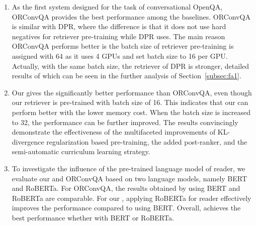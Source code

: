 \begin{enumerate}
    \item As the first system designed for the task of conversational OpenQA, ORConvQA provides the best performance among the baselines. ORConvQA is similar with DPR, where the difference is that it does not use hard negatives for retriever pre-training while DPR uses. The main reason ORConvQA performs better is the batch size of retriever pre-training is assigned with 64 as it uses 4 GPUs and set batch size to 16 per GPU. Actually, with the same batch size, the retriever of DPR is stronger, detailed results of which can be seen in the further analysis of Section~\ref{subsec:fa1}. 
    \item Our {\modelname} gives the significantly better performance than ORConvQA, even though our retriever is pre-trained with batch size of 16. This indicates that our {\modelname} can perform better with the lower memory cost. When the batch size is increased to 32, the performance can be further improved. The results convincingly demonstrate the effectiveness of the multifaceted improvements of KL-divergence regularization based pre-training, the added post-ranker, and the semi-automatic curriculum learning strategy.
    \item To investigate the influence of the pre-trained language model of reader, we evaluate our {\modelname} and ORConvQA based on two language models, namely BERT and RoBERTa. For ORConvQA, the results obtained by using BERT and RoBERTa are comparable. For our {\modelname}, applying RoBERTa for reader effectively improves the performance compared to using BERT. Overall, {\modelname} achieves the best performance whether with BERT or RoBERTa.
\end{enumerate}





